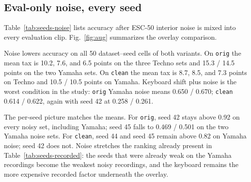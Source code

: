 \documentclass[pdflatex,sn-mathphys-num,iicol]{sn-jnl}
\theoremstyle{thmstyleone}
\theoremstyle{thmstyletwo}
\theoremstyle{thmstylethree}
\begin{document}
\subsection{Eval-only noise, every seed}\label{subsec4_4}

Table~\ref{tab:seeds-noise} lists accuracy after ESC-50 interior noise is mixed into every evaluation clip. Fig.~\ref{fig:aug} summarizes the overlay comparison.

Noise lowers accuracy on all 50 dataset--seed cells of both variants. On \texttt{orig} the mean tax is 10.2, 7.6, and 6.5 points on the three Techno sets and 15.3 / 14.5 points on the two Yamaha sets. On \texttt{clean} the mean tax is 8.7, 8.5, and 7.3 points on Techno and 10.5 / 10.5 points on Yamaha. Keyboard shift plus noise is the worst condition in the study: \texttt{orig} Yamaha noise means 0.650 / 0.670; \texttt{clean} 0.614 / 0.622, again with seed 42 at 0.258 / 0.261.

The per-seed picture matches the means. For \texttt{orig}, seed 42 stays above 0.92 on every noisy set, including Yamaha; seed 45 falls to 0.469 / 0.501 on the two Yamaha noise sets. For \texttt{clean}, seed 44 and seed 45 remain above 0.82 on Yamaha noise; seed 42 does not. Noise stretches the ranking already present in Table~\ref{tab:seeds-recorded}: the seeds that were already weak on the Yamaha recordings become the weakest noisy recordings, and the keyboard remains the more expensive recorded factor underneath the overlay.
\end{document}
